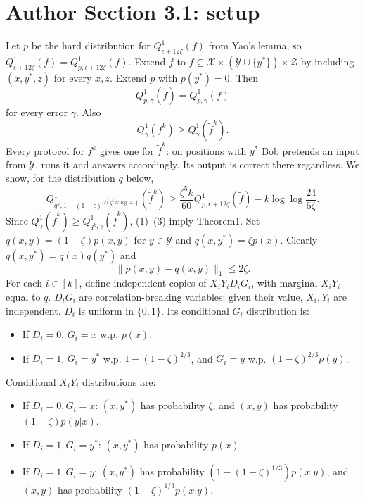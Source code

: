 \section*{Author Section 3.1: setup}
Let $p$ be the hard distribution for $Q^1_{\epsilon+12\zeta}(f)$ from Yao's lemma, so $Q^1_{\epsilon+12\zeta}(f)=Q^1_{p,\epsilon+12\zeta}(f)$. Extend $f$ to $\widetilde f\subseteq\mathcal X\times(\mathcal Y\cup\{y^*\})\times\mathcal Z$ by including $(x,y^*,z)$ for every $x,z$. Extend $p$ with $p(y^*)=0$. Then
\[Q^1_{p,\gamma}(\widetilde f)=Q^1_{p,\gamma}(f)\tag{1}\]
for every error $\gamma$. Also
\[Q^1_\gamma(f^k)\ge Q^1_\gamma(\widetilde f^k).\tag{2}\]
Every protocol for $f^k$ gives one for $\widetilde f^k$: on positions with $y^*$ Bob pretends an input from $\mathcal Y$, runs it and answers accordingly. Its output is correct there regardless. We show, for the distribution $q$ below,
\[Q^1_{q^k,1-(1-\epsilon)^{\Omega(\zeta^6k/\log|\mathcal Z|)}}(\widetilde f^k)\ge\frac{\zeta^5k}{60}Q^1_{p,\epsilon+12\zeta}(\widetilde f)-k\log\log\frac{24}{5\zeta}.\tag{3}\]
Since $Q^1_\gamma(\widetilde f^k)\ge Q^1_{q^k,\gamma}(\widetilde f^k)$, (1)--(3) imply Theorem1. Set $q(x,y)=(1-\zeta)p(x,y)$ for $y\in\mathcal Y$ and $q(x,y^*)=\zeta p(x)$. Clearly $q(x,y^*)=q(x)q(y^*)$ and
\[\|p(x,y)-q(x,y)\|_1\le2\zeta.\tag{4}\]
For each $i\in[k]$, define independent copies of $X_iY_iD_iG_i$, with marginal $X_iY_i$ equal to $q$. $D_iG_i$ are correlation-breaking variables: given their value, $X_i,Y_i$ are independent. $D_i$ is uniform in $\{0,1\}$. Its conditional $G_i$ distribution is:
\begin{itemize}\item If $D_i=0$, $G_i=x$ w.p. $p(x)$.
\item If $D_i=1$, $G_i=y^*$ w.p. $1-(1-\zeta)^{2/3}$, and $G_i=y$ w.p. $(1-\zeta)^{2/3}p(y)$.\end{itemize}
Conditional $X_iY_i$ distributions are:
\begin{itemize}\item If $D_i=0,G_i=x$: $(x,y^*)$ has probability $\zeta$, and $(x,y)$ has probability $(1-\zeta)p(y|x)$.
\item If $D_i=1,G_i=y^*$: $(x,y^*)$ has probability $p(x)$.
\item If $D_i=1,G_i=y$: $(x,y^*)$ has probability $(1-(1-\zeta)^{1/3})p(x|y)$, and $(x,y)$ has probability $(1-\zeta)^{1/3}p(x|y)$.\end{itemize}
